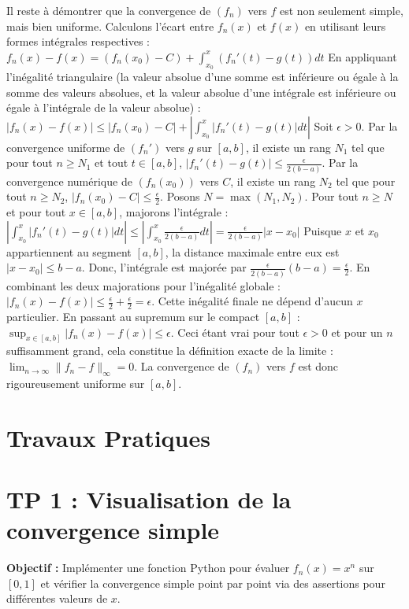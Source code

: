 \documentclass{report}
\begin{document}
Il reste à démontrer que la convergence de $(f_n)$ vers $f$ est non seulement simple, mais bien uniforme.
Calculons l'écart entre $f_n(x)$ et $f(x)$ en utilisant leurs formes intégrales respectives :
$f_n(x) - f(x) = (f_n(x_0) - C) + \int_{x_0}^x (f_n'(t) - g(t)) dt$
En appliquant l'inégalité triangulaire (la valeur absolue d'une somme est inférieure ou égale à la somme des valeurs absolues, et la valeur absolue d'une intégrale est inférieure ou égale à l'intégrale de la valeur absolue) :
$|f_n(x) - f(x)| \leq |f_n(x_0) - C| + \left| \int_{x_0}^x |f_n'(t) - g(t)| dt \right|$
Soit $\epsilon > 0$.
Par la convergence uniforme de $(f_n')$ vers $g$ sur $[a,b]$, il existe un rang $N_1$ tel que pour tout $n \geq N_1$ et tout $t \in [a,b]$, $|f_n'(t) - g(t)| \leq \frac{\epsilon}{2(b-a)}$.
Par la convergence numérique de $(f_n(x_0))$ vers $C$, il existe un rang $N_2$ tel que pour tout $n \geq N_2$, $|f_n(x_0) - C| \leq \frac{\epsilon}{2}$.
Posons $N = \max(N_1, N_2)$. Pour tout $n \geq N$ et pour tout $x \in [a,b]$, majorons l'intégrale :
$\left| \int_{x_0}^x |f_n'(t) - g(t)| dt \right| \leq \left| \int_{x_0}^x \frac{\epsilon}{2(b-a)} dt \right| = \frac{\epsilon}{2(b-a)} |x - x_0|$
Puisque $x$ et $x_0$ appartiennent au segment $[a,b]$, la distance maximale entre eux est $|x - x_0| \leq b - a$.
Donc, l'intégrale est majorée par $\frac{\epsilon}{2(b-a)} (b-a) = \frac{\epsilon}{2}$.
En combinant les deux majorations pour l'inégalité globale :
$|f_n(x) - f(x)| \leq \frac{\epsilon}{2} + \frac{\epsilon}{2} = \epsilon$.
Cette inégalité finale ne dépend d'aucun $x$ particulier. En passant au supremum sur le compact $[a,b]$ :
$\sup_{x \in [a,b]} |f_n(x) - f(x)| \leq \epsilon$.
Ceci étant vrai pour tout $\epsilon > 0$ et pour un $n$ suffisamment grand, cela constitue la définition exacte de la limite : $\lim_{n \to \infty} \|f_n - f\|_{\infty} = 0$. La convergence de $(f_n)$ vers $f$ est donc rigoureusement uniforme sur $[a,b]$.

\newpage
\chapter*{Travaux Pratiques}


\chapter*{TP 1 : Visualisation de la convergence simple}

\textbf{Objectif :} Implémenter une fonction Python pour évaluer $f_n(x) = x^n$ sur $[0,1]$ et vérifier la convergence simple point par point via des assertions pour différentes valeurs de $x$.
\end{document}
